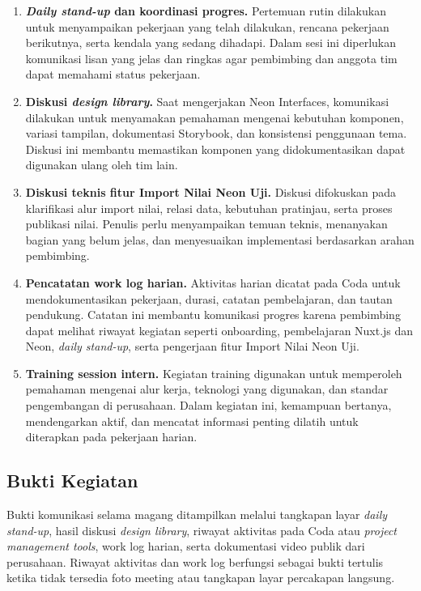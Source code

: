 \begin{enumerate}
    \item \textbf{\textit{Daily stand-up} dan koordinasi progres.} Pertemuan rutin dilakukan untuk menyampaikan pekerjaan yang telah dilakukan, rencana pekerjaan berikutnya, serta kendala yang sedang dihadapi. Dalam sesi ini diperlukan komunikasi lisan yang jelas dan ringkas agar pembimbing dan anggota tim dapat memahami status pekerjaan.
    \item \textbf{Diskusi \textit{design library}.} Saat mengerjakan Neon Interfaces, komunikasi dilakukan untuk menyamakan pemahaman mengenai kebutuhan komponen, variasi tampilan, dokumentasi Storybook, dan konsistensi penggunaan tema. Diskusi ini membantu memastikan komponen yang didokumentasikan dapat digunakan ulang oleh tim lain.
    \item \textbf{Diskusi teknis fitur Import Nilai Neon Uji.} Diskusi difokuskan pada klarifikasi alur import nilai, relasi data, kebutuhan pratinjau, serta proses publikasi nilai. Penulis perlu menyampaikan temuan teknis, menanyakan bagian yang belum jelas, dan menyesuaikan implementasi berdasarkan arahan pembimbing.
    \item \textbf{Pencatatan work log harian.} Aktivitas harian dicatat pada Coda untuk mendokumentasikan pekerjaan, durasi, catatan pembelajaran, dan tautan pendukung. Catatan ini membantu komunikasi progres karena pembimbing dapat melihat riwayat kegiatan seperti onboarding, pembelajaran Nuxt.js dan Neon, \textit{daily stand-up}, serta pengerjaan fitur Import Nilai Neon Uji.
    \item \textbf{Training session intern.} Kegiatan training digunakan untuk memperoleh pemahaman mengenai alur kerja, teknologi yang digunakan, dan standar pengembangan di perusahaan. Dalam kegiatan ini, kemampuan bertanya, mendengarkan aktif, dan mencatat informasi penting dilatih untuk diterapkan pada pekerjaan harian.
\end{enumerate}

\subsection{Bukti Kegiatan}
Bukti komunikasi selama magang ditampilkan melalui tangkapan layar \textit{daily stand-up}, hasil diskusi \textit{design library}, riwayat aktivitas pada Coda atau \textit{project management tools}, work log harian, serta dokumentasi video publik dari perusahaan. Riwayat aktivitas dan work log berfungsi sebagai bukti tertulis ketika tidak tersedia foto meeting atau tangkapan layar percakapan langsung.

